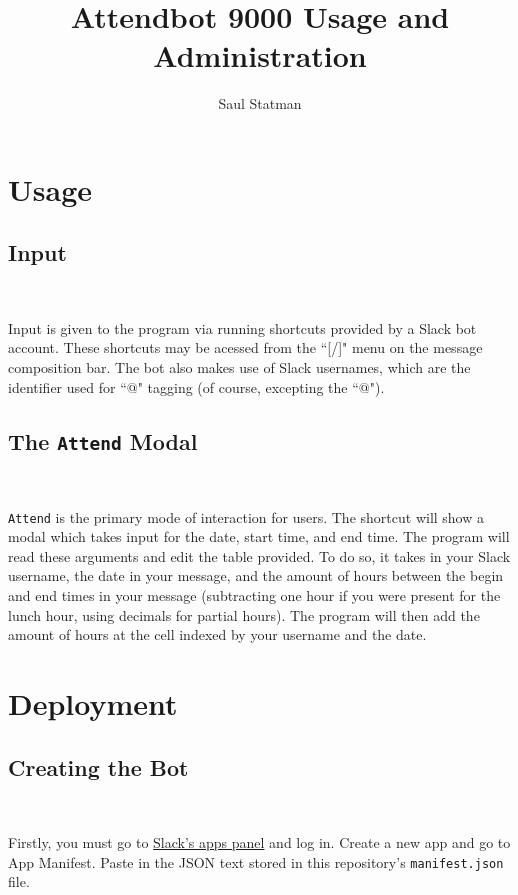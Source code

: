 \documentclass{article}
\begin{document}
\title{Attendbot 9000 Usage and Administration}

\author{Saul Statman}

\maketitle

\section{Usage}

\subsection{Input}

\

Input is given to the program via running shortcuts provided by a Slack bot account. These shortcuts may be acessed from the ``[/]" menu on the message composition bar. The bot also makes use of Slack usernames, which are the identifier used for ``@" tagging (of course, excepting the ``@").

\subsection{The \texttt{Attend} Modal}

\

\texttt{Attend} is the primary mode of interaction for users. The shortcut will show a modal which takes input for the date, start time, and end time. The program will read these arguments and edit the table provided. To do so, it takes in your Slack username, the date in your message, and the amount of hours between the begin and end times in your message (subtracting one hour if you were present for the lunch hour, using decimals for partial hours). The program will then add the amount of hours at the cell indexed by your username and the date.

\section{Deployment}

\subsection{Creating the Bot}

\

Firstly, you must go to \href{https://api.slack.com/apps}{Slack's apps panel} and log in. Create a new app and go to App Manifest. Paste in the JSON text stored in this repository's \texttt{manifest.json} file.
\end{document}
